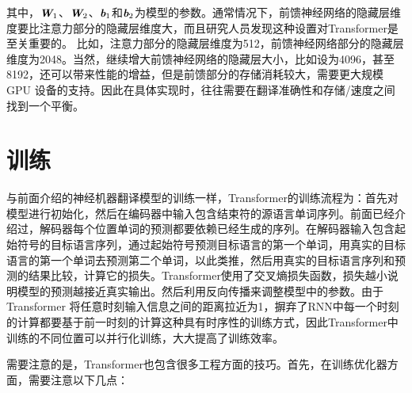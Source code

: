 \noindent 其中，$\textbf{\em W}_1$、$\textbf{\em W}_2$、$\textbf{\em b}_1$和$\textbf{\em b}_2$为模型的参数。通常情况下，前馈神经网络的隐藏层维度要比注意力部分的隐藏层维度大，而且研究人员发现这种设置对Transformer是至关重要的。 比如，注意力部分的隐藏层维度为512，前馈神经网络部分的隐藏层维度为2048。当然，继续增大前馈神经网络的隐藏层大小，比如设为4096，甚至8192，还可以带来性能的增益，但是前馈部分的存储消耗较大，需要更大规模GPU 设备的支持。因此在具体实现时，往往需要在翻译准确性和存储/速度之间找到一个平衡。

\sectionnewpage
\section{训练}

\parinterval 与前面介绍的神经机器翻译模型的训练一样，Transformer的训练流程为：首先对模型进行初始化，然后在编码器中输入包含结束符的源语言单词序列。前面已经介绍过，解码器每个位置单词的预测都要依赖已经生成的序列。在解码器输入包含起始符号的目标语言序列，通过起始符号预测目标语言的第一个单词，用真实的目标语言的第一个单词去预测第二个单词，以此类推，然后用真实的目标语言序列和预测的结果比较，计算它的损失。Transformer使用了交叉熵损失函数，损失越小说明模型的预测越接近真实输出。然后利用反向传播来调整模型中的参数。由于Transformer 将任意时刻输入信息之间的距离拉近为1，摒弃了RNN中每一个时刻的计算都要基于前一时刻的计算这种具有时序性的训练方式，因此Transformer中训练的不同位置可以并行化训练，大大提高了训练效率。

%

\parinterval 需要注意的是，Transformer也包含很多工程方面的技巧。首先，在训练优化器方面，需要注意以下几点：

